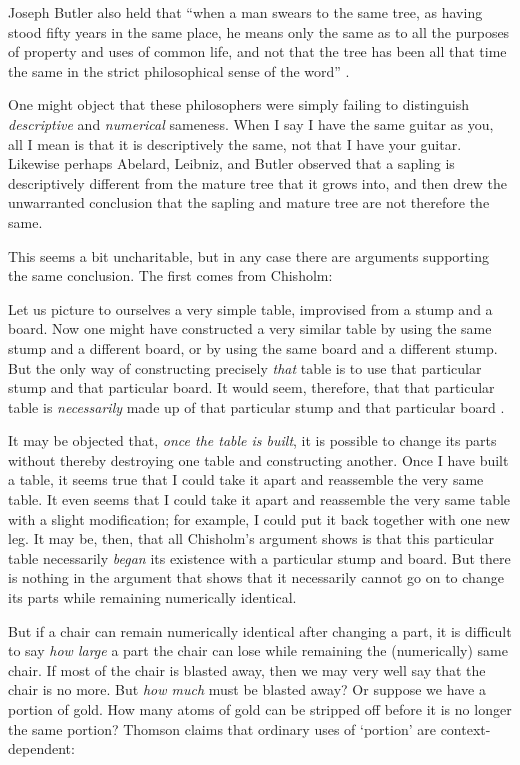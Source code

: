 \documentclass[11pt]{article}
\newenvironment{squote}{%
\begin{spacing}{1}
\begin{list}{}{%
\setlength{\labelwidth}{0pt}%
\rightmargin\leftmargin%
}
\item\relax
}{%
\end{list}%
\end{spacing}
}
\begin{document}
\begin{spacing}{1.5}
Joseph Butler also held that ``when a man swears to the same tree, as
having stood fifty years in the same place, he means only the same as
to all the purposes of property and uses of common life, and not that
the tree has been all that time the same in the strict philosophical
sense of the word'' \citeyearpar[100]{butler1975a}.

One might object that these philosophers were simply failing to
distinguish {\em descriptive} and {\em numerical} sameness.  When I
say I have the same guitar as you, all I mean is that it is
descriptively the same, not that I have your guitar.  Likewise perhaps
Abelard, Leibniz, and Butler observed that a sapling is descriptively
different from the mature tree that it grows into, and then drew the
unwarranted conclusion that the sapling and mature tree are not
therefore the same.

This seems a bit uncharitable, but in any case there are arguments
supporting the same conclusion.  The first comes from Chisholm:

\begin{squote}
Let us picture to ourselves a very simple table, improvised from a
stump and a board.  Now one might have constructed a very similar
table by using the same stump and a different board, or by using the
same board and a different stump.  But the only way of constructing
precisely {\em that} table is to use that particular stump and that
particular board.  It would seem, therefore, that that particular
table is {\em necessarily} made up of that particular stump and that
particular board \citeyearpar[146]{chisholm1979}.
\end{squote}

It may be objected that, {\em once the table is built}, it is possible
to change its parts without thereby destroying one table and
constructing another.  Once I have built a table, it seems true that I
could take it apart and reassemble the very same table.  It even seems
that I could take it apart and reassemble the very same table with a
slight modification; for example, I could put it back together with
one new leg.  It may be, then, that all Chisholm's argument shows is
that this particular table necessarily {\em began} its existence with
a particular stump and board.  But there is nothing in the argument
that shows that it necessarily cannot go on to change its parts while
remaining numerically identical.

But if a chair can remain numerically identical after changing a part,
it is difficult to say {\em how large} a part the chair can lose while
remaining the (numerically) same chair.  If most of the chair is
blasted away, then we may very well say that the chair is no more.
But {\em how much} must be blasted away?  Or suppose we have a portion
of gold.  How many atoms of gold can be stripped off before it is no
longer the same portion?  Thomson claims that ordinary uses of
`portion' are context-dependent:


\end{spacing}
\end{document}
